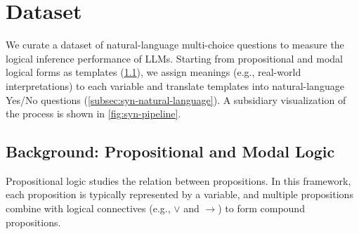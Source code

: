 \section{Dataset}
\label{sec:dataset}
We curate a dataset of natural-language multi-choice questions to measure the logical inference performance of LLMs.
Starting from propositional and modal logical forms as templates (\cref{subsec:syn-logic}), we assign meanings (e.g., real-world interpretations) to each variable and translate templates into natural-language Yes/No questions (\cref{subsec:syn-natural-language}).
A subsidiary visualization of the process is shown in \cref{fig:syn-pipeline}.

\begin{figure*}[t]
  
  \caption{
    The data synthesis pipeline: for each variable in logic forms (\cref{subsec:syn-logic}), we assign meanings to them to obtain the natural language question-answering pairs (\cref{subsec:syn-natural-language}).
  }
  \label{fig:syn-pipeline}
\end{figure*}


\subsection{Background: Propositional and Modal Logic}
\label{subsec:syn-logic}

Propositional logic studies the relation between propositions.
In this framework, each proposition is typically represented by a variable, and multiple propositions combine with logical connectives (e.g., $\lor$ and $\rightarrow$) to form compound propositions.

